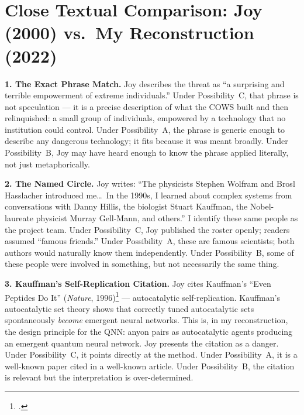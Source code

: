 \section*{Close Textual Comparison: Joy (2000) vs.\ My Reconstruction (2022)}
\label{pos07:close-textual-comparison-joy-2000-vs-my}

\textbf{1. The Exact Phrase Match.} Joy describes the threat as ``a surprising and terrible empowerment of extreme individuals.'' Under Possibility~C, that phrase is not speculation --- it is a precise description of what the COWS built and then relinquished: a small group of individuals, empowered by a technology that no institution could control. Under Possibility~A, the phrase is generic enough to describe any dangerous technology; it fits because it was meant broadly. Under Possibility~B, Joy may have heard enough to know the phrase applied literally, not just metaphorically.

\textbf{2. The Named Circle.} Joy writes: ``The physicists Stephen Wolfram and Brosl Hasslacher introduced me\ldots\ In the 1990s, I learned about complex systems from conversations with Danny Hillis, the biologist Stuart Kauffman, the Nobel-laureate physicist Murray Gell-Mann, and others.'' I identify these same people as the project team. Under Possibility~C, Joy published the roster openly; readers assumed ``famous friends.'' Under Possibility~A, these are famous scientists; both authors would naturally know them independently. Under Possibility~B, some of these people were involved in something, but not necessarily the same thing.%

\textbf{3. Kauffman's Self-Replication Citation.} Joy cites Kauffman's ``Even Peptides Do It'' (\textit{Nature}, 1996)\footcite{kauffman1996} --- autocatalytic self-replication. Kauffman's autocatalytic set theory shows that correctly tuned autocatalytic sets spontaneously \textit{become} emergent neural networks. This is, in my reconstruction, the design principle for the QNN: anyon pairs as autocatalytic agents producing an emergent quantum neural network. Joy presents the citation as a danger. Under Possibility~C, it points directly at the method. Under Possibility~A, it is a well-known paper cited in a well-known article. Under Possibility~B, the citation is relevant but the interpretation is over-determined.%


